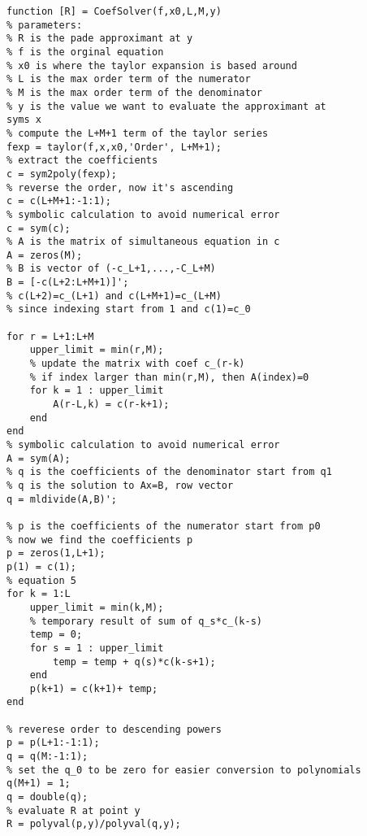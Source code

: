 \lstset{basicstyle=\footnotesize,style=myCustomMatlabStyle}
\begin{lstlisting}
function [R] = CoefSolver(f,x0,L,M,y)
% parameters:
% R is the pade approximant at y
% f is the orginal equation
% x0 is where the taylor expansion is based around
% L is the max order term of the numerator
% M is the max order term of the denominator
% y is the value we want to evaluate the approximant at
syms x
% compute the L+M+1 term of the taylor series
fexp = taylor(f,x,x0,'Order', L+M+1);
% extract the coefficients
c = sym2poly(fexp);
% reverse the order, now it's ascending
c = c(L+M+1:-1:1);
% symbolic calculation to avoid numerical error
c = sym(c);
% A is the matrix of simultaneous equation in c
A = zeros(M);
% B is vector of (-c_L+1,...,-C_L+M) 
B = [-c(L+2:L+M+1)]';    
% c(L+2)=c_(L+1) and c(L+M+1)=c_(L+M)
% since indexing start from 1 and c(1)=c_0

for r = L+1:L+M
    upper_limit = min(r,M);
    % update the matrix with coef c_(r-k)
    % if index larger than min(r,M), then A(index)=0
    for k = 1 : upper_limit
        A(r-L,k) = c(r-k+1);
    end
end
% symbolic calculation to avoid numerical error
A = sym(A);
% q is the coefficients of the denominator start from q1
% q is the solution to Ax=B, row vector
q = mldivide(A,B)';

% p is the coefficients of the numerator start from p0
% now we find the coefficients p
p = zeros(1,L+1);
p(1) = c(1);
% equation 5
for k = 1:L
    upper_limit = min(k,M);
    % temporary result of sum of q_s*c_(k-s)
    temp = 0;
    for s = 1 : upper_limit
        temp = temp + q(s)*c(k-s+1);
    end
    p(k+1) = c(k+1)+ temp;
end

% reverese order to descending powers
p = p(L+1:-1:1);
q = q(M:-1:1);
% set the q_0 to be zero for easier conversion to polynomials
q(M+1) = 1;
q = double(q);
% evaluate R at point y
R = polyval(p,y)/polyval(q,y);


\end{lstlisting}